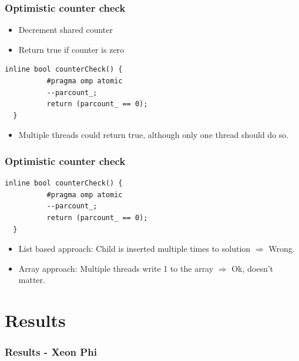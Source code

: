 \begin{frame}[fragile]
 \frametitle{Optimistic counter check}
 \begin{itemize}
  \item Decrement shared counter
  \item Return true if counter is zero
 \end{itemize}
 \begin{lstlisting}[style=cpp]
  inline bool counterCheck() {
          #pragma omp atomic
          --parcount_;
          return (parcount_ == 0);
  }
 \end{lstlisting}
 \begin{itemize}
  \item Multiple threads could return true, although only one thread should do so.
 \end{itemize}
\end{frame}

\begin{frame}[fragile]
 \frametitle{Optimistic counter check}
  \begin{lstlisting}[style=cpp]
  inline bool counterCheck() {
          #pragma omp atomic
          --parcount_;
          return (parcount_ == 0);
  }
 \end{lstlisting}
 \begin{itemize}
  \item List based approach: Child is inserted multiple times to solution $\Rightarrow$ Wrong.
  \item Array approach: Multiple threads write 1 to the array $\Rightarrow$ Ok, doesn't matter.
 \end{itemize}
\end{frame}

\section{Results}

\begin{frame}
\frametitle{Results - Xeon Phi}



\end{frame}


 
